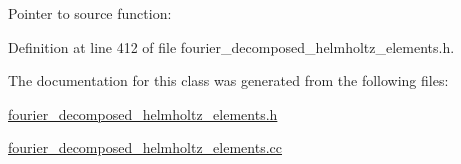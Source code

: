 Pointer to source function\+: 



Definition at line 412 of file fourier\+\_\+decomposed\+\_\+helmholtz\+\_\+elements.\+h.



The documentation for this class was generated from the following files\+:\begin{DoxyCompactItemize}
\item 
\hyperlink{fourier__decomposed__helmholtz__elements_8h}{fourier\+\_\+decomposed\+\_\+helmholtz\+\_\+elements.\+h}\item 
\hyperlink{fourier__decomposed__helmholtz__elements_8cc}{fourier\+\_\+decomposed\+\_\+helmholtz\+\_\+elements.\+cc}\end{DoxyCompactItemize}
